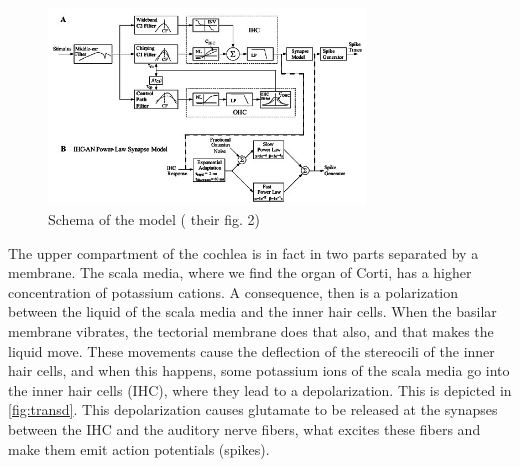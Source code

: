 \begin{figure}[ht]
	\centering
  \includegraphics[width=0.75\textwidth]{images/www-bme-rochester-edu-schematicDiagram-level.jpg}
	\caption{Schema of the model (\cite{Model1} their fig. 2)}
	\label{fig:modelsch}
\end{figure}

The upper compartment of the cochlea is in fact in two parts separated by a membrane.
The scala media, where we find the organ of Corti, has a higher 
concentration of potassium cations. A consequence, then is a polarization between
the liquid of the scala media and the inner hair cells. 
When the basilar membrane vibrates, the tectorial membrane does 
that also, and that makes the liquid move. 
These movements cause the deflection of the stereocili 
of the inner hair cells, and when this happens, some potassium ions of the 
scala media go into the inner hair cells (IHC), where they lead to a depolarization.
This is depicted in \autoref{fig:transd}.
This depolarization causes glutamate to be released at the synapses %
between the IHC and the auditory nerve fibers, what excites these fibers 
and make them emit action potentials (spikes).




